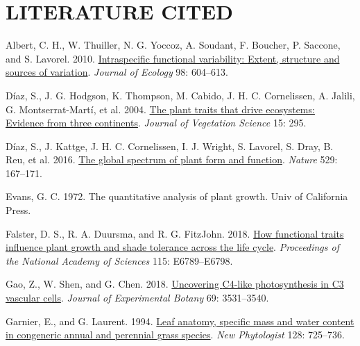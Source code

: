 \documentclass[
  12pt,
  a4paper,
,tablecaptionabove
]{scrartcl}
\newlength{\cslhangindent}
\newenvironment{CSLReferences}[2] %
 {%
  \setlength{\parindent}{0pt}
  \ifodd #1 \everypar{\setlength{\hangindent}{\cslhangindent}}\ignorespaces\fi
  \ifnum #2 > 0
  \setlength{\parskip}{#2\baselineskip}
  \fi
 }%
 {}
\begin{document}
\hypertarget{literature-cited}{%
\section{LITERATURE CITED}\label{literature-cited}}

\hypertarget{refs}{}
\begin{CSLReferences}{1}{0}
\leavevmode{}%
Albert, C. H., W. Thuiller, N. G. Yoccoz, A. Soudant, F. Boucher, P.
Saccone, and S. Lavorel. 2010.
\href{https://doi.org/10.1111/j.1365-2745.2010.01651.x}{Intraspecific
functional variability: {Extent}, structure and sources of variation}.
\emph{Journal of Ecology} 98: 604--613.

\leavevmode{}%
Díaz, S., J. G. Hodgson, K. Thompson, M. Cabido, J. H. C. Cornelissen,
A. Jalili, G. Montserrat-Martí, et al. 2004.
\href{https://doi.org/10.1658/1100-9233(2004)015\%5B0295:TPTTDE\%5D2.0.CO;2}{The
plant traits that drive ecosystems: {Evidence} from three continents}.
\emph{Journal of Vegetation Science} 15: 295.

\leavevmode{}%
Díaz, S., J. Kattge, J. H. C. Cornelissen, I. J. Wright, S. Lavorel, S.
Dray, B. Reu, et al. 2016.
\href{https://doi.org/10.1038/nature16489}{The global spectrum of plant
form and function}. \emph{Nature} 529: 167--171.

\leavevmode{}%
Evans, G. C. 1972. The quantitative analysis of plant growth. {Univ of
California Press}.

\leavevmode{}%
Falster, D. S., R. A. Duursma, and R. G. FitzJohn. 2018.
\href{https://doi.org/10.1073/pnas.1714044115}{How functional traits
influence plant growth and shade tolerance across the life cycle}.
\emph{Proceedings of the National Academy of Sciences} 115:
E6789--E6798.

\leavevmode{}%
Gao, Z., W. Shen, and G. Chen. 2018.
\href{https://doi.org/10.1093/jxb/ery155}{Uncovering {C4-like}
photosynthesis in {C3} vascular cells}. \emph{Journal of Experimental
Botany} 69: 3531--3540.

\leavevmode{}%
Garnier, E., and G. Laurent. 1994.
\href{https://doi.org/10.1111/j.1469-8137.1994.tb04036.x}{Leaf anatomy,
specific mass and water content in congeneric annual and perennial grass
species}. \emph{New Phytologist} 128: 725--736.


\end{CSLReferences}
\end{document}
